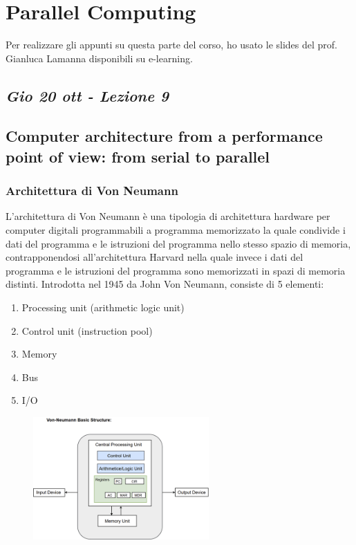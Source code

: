 \chapter{Parallel Computing}
\vfill
Per realizzare gli appunti su questa parte del corso, ho usato le slides del prof. Gianluca Lamanna disponibili su e-learning.

\newpage
\section{\textit{Gio 20 ott - Lezione 9}}
\section{Computer architecture from a
performance point of view: from
serial to parallel}

\subsection{Architettura di Von Neumann}
L'architettura di Von Neumann è una tipologia di architettura hardware per computer digitali programmabili a programma memorizzato la quale condivide i dati del programma e le istruzioni del programma nello stesso spazio di memoria, contrapponendosi all'architettura Harvard nella quale invece i dati del programma e le istruzioni del programma sono memorizzati in spazi di memoria distinti. 
Introdotta nel 1945 da John Von
Neumann, consiste di 5 elementi:
\begin{enumerate}
    \item Processing unit (arithmetic logic
unit)
    \item Control unit (instruction pool)
    \item Memory
    \item Bus
    \item I/O
\end{enumerate}

\begin{figure}[ht]
    \centering
    \includegraphics[width=0.6\textwidth]{figure_parallel/VN_arch.png}
\end{figure}
\FloatBarrier


